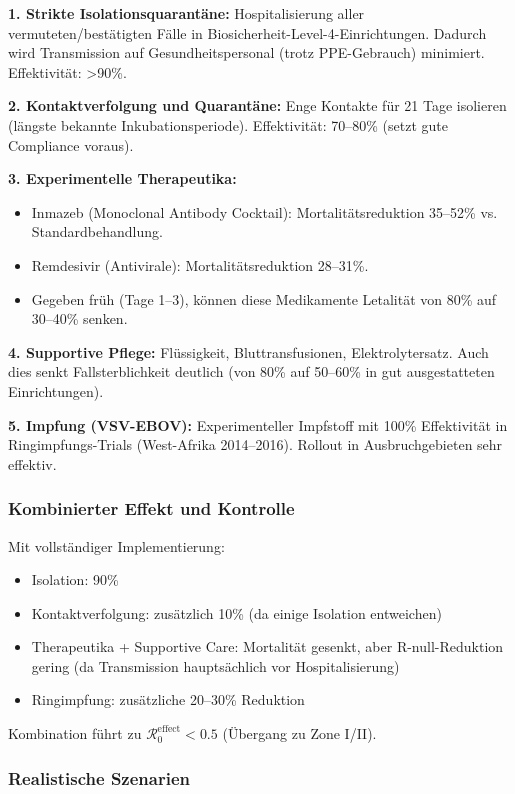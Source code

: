 ﻿\documentclass[a4paper,12pt,twoside]{article}
\theoremstyle{definition}
\begin{document}
\textbf{1. Strikte Isolationsquarantäne:} Hospitalisierung aller vermuteten/bestätigten Fälle in Biosicherheit-Level-4-Einrichtungen. Dadurch wird Transmission auf Gesundheitspersonal (trotz PPE-Gebrauch) minimiert. Effektivität: >90\%.

\textbf{2. Kontaktverfolgung und Quarantäne:} Enge Kontakte für 21 Tage isolieren (längste bekannte Inkubationsperiode). Effektivität: 70--80\% (setzt gute Compliance voraus).

\textbf{3. Experimentelle Therapeutika:} 
\begin{itemize}
\item Inmazeb (Monoclonal Antibody Cocktail): Mortalitätsreduktion 35--52\% vs. Standardbehandlung.
\item Remdesivir (Antivirale): Mortalitätsreduktion 28--31\%.
\item Gegeben früh (Tage 1--3), können diese Medikamente Letalität von 80\% auf 30--40\% senken.
\end{itemize}

\textbf{4. Supportive Pflege:} Flüssigkeit, Bluttransfusionen, Elektrolytersatz. Auch dies senkt Fallsterblichkeit deutlich (von 80\% auf 50--60\% in gut ausgestatteten Einrichtungen).

\textbf{5. Impfung (VSV-EBOV):} Experimenteller Impfstoff mit 100\% Effektivität in Ringimpfungs-Trials (West-Afrika 2014--2016). Rollout in Ausbruchgebieten sehr effektiv.

\subsubsection{Kombinierter Effekt und Kontrolle}

Mit vollständiger Implementierung:
\begin{itemize}
\item Isolation: 90\%
\item Kontaktverfolgung: zusätzlich 10\% (da einige Isolation entweichen)
\item Therapeutika + Supportive Care: Mortalität gesenkt, aber R-null-Reduktion gering (da Transmission hauptsächlich vor Hospitalisierung)
\item Ringimpfung: zusätzliche 20--30\% Reduktion
\end{itemize}

Kombination führt zu $\mathcal{R}_0^{\text{effect}} < 0.5$ (Übergang zu Zone I/II).

\subsubsection{Realistische Szenarien}
\end{document}
